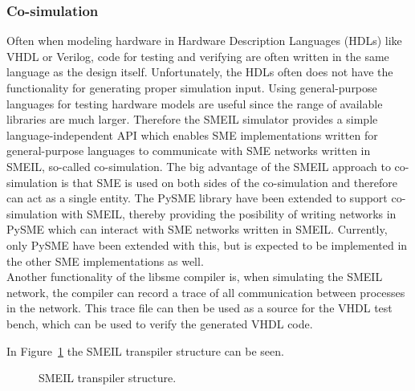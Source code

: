 \subsubsection{Co-simulation}
Often when modeling hardware in Hardware Description Languages (HDLs) like VHDL or Verilog, code for testing and verifying are often written in the same language as the design itself. Unfortunately, the HDLs often does not have the functionality for generating proper simulation input. Using general-purpose languages for testing hardware models are useful since the range of available libraries are much larger.
Therefore the SMEIL simulator provides a simple language-independent API which enables SME implementations written for general-purpose languages to communicate with SME networks written in SMEIL, so-called co-simulation.
The big advantage of the SMEIL approach to co-simulation is that SME is used on both sides of the co-simulation and therefore can act as a single entity.
The PySME %
library have been extended to support co-simulation with SMEIL, thereby providing the posibility of writing networks in PySME which can interact with SME networks written in SMEIL. Currently, only PySME have been extended with this, but is expected to be implemented in the other SME implementations as well.\\
Another functionality of the libsme compiler is, when simulating the SMEIL network, the compiler can record a trace of all communication between processes in the network. This trace file can then be used as a source for the VHDL test bench, which can be used to verify the generated VHDL code.

In Figure~\ref{fig:smeil_transpiler} the SMEIL transpiler structure can be seen.

\begin{figure}[!ht]
  \centering
  \caption{SMEIL transpiler structure.}
  \label{fig:smeil_transpiler}
\end{figure}





